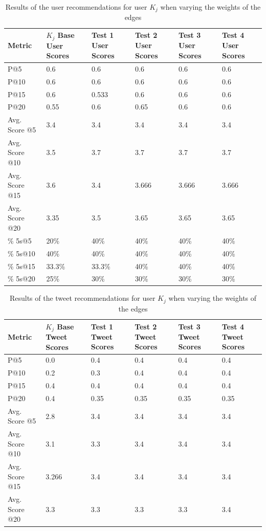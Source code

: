 \begin{table}
\centering
\begin{tabular}{l|p{1.5cm}|p{1.5cm}|p{1.5cm}|p{1.5cm}|p{1.5cm}}
{\bf Metric} & {\bf $K_{j}$ Base User Scores} & {\bf Test 1 User Scores} & {\bf Test 2 User Scores} & {\bf Test 3 User Scores} & {\bf Test 4 User Scores} \\ \hline
P@5   & 0.6 & 0.6 & 0.6 & 0.6 & 0.6 \\ \hline
P@10 & 0.6 & 0.6 & 0.6 & 0.6 & 0.6 \\ \hline
P@15 & 0.6 & 0.533 & 0.6 & 0.6 & 0.6 \\ \hline
P@20 & 0.55 & 0.6 & 0.65 & 0.6 & 0.6 \\ \hline

Avg. Score @5   & 3.4 & 3.4 & 3.4 & 3.4 & 3.4 \\ \hline
Avg. Score @10 & 3.5 & 3.7 & 3.7 & 3.7 & 3.7 \\ \hline
Avg. Score @15 & 3.6 & 3.4 & 3.666 & 3.666 & 3.666 \\ \hline
Avg. Score @20 & 3.35 & 3.5 & 3.65 & 3.65 & 3.65 \\ \hline

\% 5s@5    & 20\% & 40\% & 40\% & 40\% & 40\% \\ \hline
\% 5s@10  & 40\% & 40\% & 40\% & 40\% & 40\% \\ \hline
\% 5s@15  & 33.3\% & 33.3\% & 40\% & 40\% & 40\% \\ \hline
\% 5s@20  & 25\% & 30\% & 30\% & 30\% & 30\% \\
\end{tabular}
\caption[User recommendation results when varying the edge weights]{Results of the user recommendations for user $K_{j}$ when varying the weights of the edges}
\label{tab:WeightsTestsUsers}
\end{table}


\begin{table}
\centering
\begin{tabular}{l|p{1.5cm}|p{1.5cm}|p{1.5cm}|p{1.5cm}|p{1.5cm}}
{\bf Metric} & {\bf $K_{j}$ Base Tweet Scores} & {\bf Test 1 Tweet Scores} & {\bf Test 2 Tweet Scores} & {\bf Test 3 Tweet Scores} & {\bf Test 4 Tweet Scores} \\ \hline
P@5   & 0.0 & 0.4 & 0.4 & 0.4 & 0.4 \\ \hline
P@10 & 0.2 & 0.3 & 0.4 & 0.4 & 0.4 \\ \hline
P@15 & 0.4 & 0.4 & 0.4 & 0.4 & 0.4 \\ \hline
P@20 & 0.4 & 0.35 & 0.35 & 0.35 & 0.35 \\ \hline

Avg. Score @5   & 2.8 & 3.4 & 3.4 & 3.4 & 3.4 \\ \hline
Avg. Score @10 & 3.1 & 3.3 & 3.4 & 3.4 & 3.4 \\ \hline
Avg. Score @15 & 3.266 & 3.4 & 3.4 & 3.4 & 3.4 \\ \hline
Avg. Score @20 & 3.3 & 3.3 & 3.3 & 3.3 & 3.4 \\
\end{tabular}
\caption[Tweet recommendation results when varying the edge weights]{Results of the tweet recommendations for user $K_{j}$ when varying the weights of the edges}
\label{tab:WeightsTestsTweets}
\end{table}


